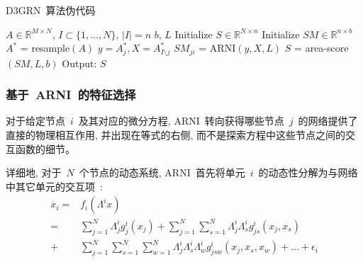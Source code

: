 \begin{algorithm}
  \caption{D3GRN~算法伪代码}
  \label{alg:D3GRN}
  \begin{algorithmic}[1]
  \Require $A \in \mathbb{R}^{M \times N}$, $I \subset \{1,\ldots,N\}$, 
            $|I| = n$                                   
  \Ensure $b$, $L$                                      
  \State Initialize $S \in \mathbb{R}^{N \times n}$     
  \State Initialize $SM \in \mathbb{R}^{n \times b}$     
                                     
        \State $A^{*}$ = resample$(A)$                  
                                              
        \State $y = A^{*}_j, X = A^{*}_{I\setminus j}$
        \State $SM_{ji}$ = ARNI$(y,X,L)$                    
        \EndFor
  \EndFor           
  \State $S$ = area-score$(SM,L,b)$                      
  \State Output: $S$                                    
\end{algorithmic}
\end{algorithm}


\subsubsection{基于~ARNI~的特征选择}

对于给定节点~$i$~及其对应的微分方程, 
ARNI~转向获得哪些节点~$j$~的网络提供了直接的物理相互作用, 并出现在等式的右侧, 
而不是探索方程中这些节点之间的交互函数的细节。

详细地, 对于~$N$~个节点的动态系统, 
ARNI~首先将单元~$i$~的动态性分解为与网络中其它单元的交互项~\cite{casadiego2017model}:
\begin{equation}
\label{eq:xi}
\begin{split}
\dot{x_i}= & f_i(\Lambda ^i x)\\
         = &\sum_{j=1}^{N} \Lambda^i_{j} g^i_j(x_j) + 
                             \sum_{j=1}^{N} \sum_{s=1}^{N}\Lambda^i_{j}\Lambda^i_{s}g^i_{js}(x_j,x_s)\\
         + &\sum_{j=1}^{N} \sum_{s=1}^{N} \sum_{w=1}^{N}\Lambda^i_{j}\Lambda^i_{s}\Lambda^i_{w}g^i_{jsw}(x_j,x_s,x_w)+ \ldots + \epsilon_{i}
\end{split}
\end{equation}

